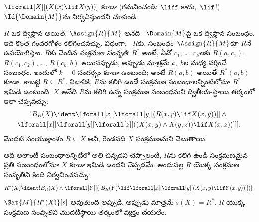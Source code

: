 \documentclass[../../../include/open-logic-section]{subfiles}
\begin{document}
\begin{prob}
$\lforall[X][(X(x) \lif X(y))]$ కూడా (గమనించండి:
$\liff$ కాదు,~$\lif$!) $\Id{\Domain{M}}$ను నిర్వచిస్తుందని చూపండి.
\end{prob}

\begin{ex}
$R$ ఒక ద్విస్థాన  అయితే, $\Assign{R}{M}$ అనేది
~$\Domain{M}$పై ఒక ద్విస్థాన సంబంధం. ఇది కొంత గందరగోళం కలిగించవచ్చు.
విధంగా, ~$R$కు, సంబంధం~$\Assign{R}{M}$కూ $R$నే
ఉపయోగిస్తాం. $R$కు చెందిన \emph{సంక్రమణ సంవృతి}~$R^*$ అంటే, ఏవో
$c_1$, \dots, $c_k$లకు $R(a,c_1)$, $R(c_1, c_2)$, \dots,
$R(c_k,b)$ అయినప్పుడు, అప్పుడు మాత్రమే $a$,~$b$ల మధ్య వర్తించే
సంబంధం. ఇందులో $k = 0$ సందర్భం కూడా ఉంటుంది; అంటే $R(a,b)$ అయితే
$R^*(a,b)$ కూడా. కాబట్టి $R \subseteq R^*$. నిజానికి, $R$ను కలిగి ఉండే సంక్రమణ
సంబంధాలన్నింటిలోనూ $R^*$ ఇమిడి ఉంటుంది. $X$ అనేది $R$ను కలిగి
ఉన్న సంక్రమణ సంబంధమని ద్వితీయ-స్థాయి తర్కంలో ఇలా చెప్పవచ్చు:
\begin{multline*}
  !B_R(X) \ident \lforall[x][\lforall[y][(R(x,y) \lif X(x, y))]] \land {}\\
\lforall[x][\lforall[y][\lforall[z][((X(x,y) \land X(y,z)) \lif X(x,
      z))]]].
\end{multline*}
మొదటి సంయుక్తాంశం $R \subseteq X$ అని, రెండవది $X$ సంక్రమణమని
చెబుతాయి.

  అది అలాంటి సంబంధాలన్నిటిలో అతి చిన్నదని చెప్పాలంటే, $R$ను కలిగి ఉండి
సంక్రమణమైన ప్రతి సంబంధంలోనూ $X$ కూడా ఇమిడి ఉందని చెప్పడమే. అందువల్ల
$R$ యొక్క సంక్రమణ సంవృతిని కింది  నిర్వచించవచ్చు:
\[
R^*(X) \ident !B_R(X) \land \lforall[Y][(!B_R(Y) \lif
  \lforall[x][\lforall[y][(X(x, y) \lif Y(x,y))]])].
\]
$\Sat{M}{R^*(X)}[s]$ అవుతుంది అప్పుడే, అప్పుడు మాత్రమే $s(X) = R^*$.
$R$ యొక్క సంక్రమణ సంవృతిని మొదటిస్థాయి తర్కంలో వ్యక్తం చేయలేం.
\end{ex}
\end{document}
